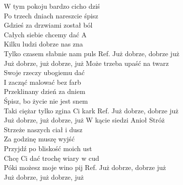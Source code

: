 \auth{}

W tym pokoju bardzo cicho dziś \\
Po trzech dniach nareszcie śpisz \\
Gdzieś za drzwiami został ból \tab{}\\
Całych siebie chcemy dać \tab{} A\\
Kilku ludzi dobrze nas zna \tab{}\\
Tylko czasem słabnie nam puls 
\hops
Ref. Już dobrze, dobrze już \tab{}\\
 Już dobrze, już dobrze, już 
\hops
Może trzeba upaść na twarz\\
Swoje rzeczy ubogiemu dać\\
I zacząć malować bez farb\\
Przeklinany dzień za dniem\\
Śpisz, bo życie nie jest snem\\
Taki ciężar tylko zgina Ci kark
\hops
Ref. Już dobrze, dobrze już\\
 Już dobrze, już dobrze, już
\hops
W kącie siedzi Anioł Stróż\\
Strzeże naszych ciał i dusz\\
Za godzinę muszę wyjść\\
Przyjdź po bliskość moich ust\\
Chcę Ci dać trochę wiary w cud\\
Póki możesz moje wino pij
\hops
Ref. Już dobrze, dobrze już\\
 Już dobrze, już dobrze, już